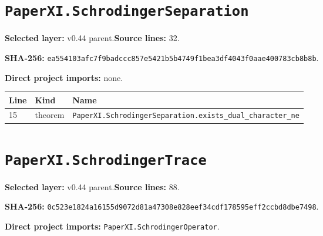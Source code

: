 \documentclass[10pt,oneside]{book}
\begin{document}
\section{\texorpdfstring{\nolinkurl{PaperXI.SchrodingerSeparation}}{PaperXI.SchrodingerSeparation}}\label{module:PaperXI.SchrodingerSeparation}

\textbf{Selected layer:} v0.44 parent.\quad\textbf{Source lines:} 32.\par\textbf{SHA-256:} {\scriptsize\nolinkurl{ea554103afc7f9badccc857e5421b5b4749f1bea3df4043f0aae400783cb8b8b}}.


\textbf{Direct project imports:} none.

\begin{longtable}{@{}p{}p{}p{}@{}}\toprule Line&Kind&Name\\\midrule\endhead

15&theorem&\nolinkurl{PaperXI.SchrodingerSeparation.exists_dual_character_ne}\\

\bottomrule\end{longtable}

\section{\texorpdfstring{\nolinkurl{PaperXI.SchrodingerTrace}}{PaperXI.SchrodingerTrace}}\label{module:PaperXI.SchrodingerTrace}

\textbf{Selected layer:} v0.44 parent.\quad\textbf{Source lines:} 88.\par\textbf{SHA-256:} {\scriptsize\nolinkurl{0c523e1824a16155d9072d81a47308e828eef34cdf178595eff2ccbd8dbe7498}}.


\textbf{Direct project imports:} \nolinkurl{PaperXI.SchrodingerOperator}.
\end{document}

